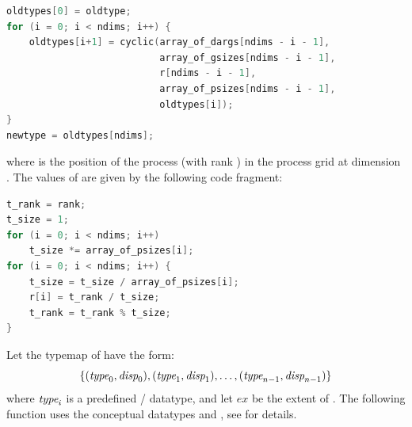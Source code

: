 \begin{lstlisting}[language=C]
oldtypes[0] = oldtype;
for (i = 0; i < ndims; i++) {
    oldtypes[i+1] = cyclic(array_of_dargs[ndims - i - 1],
                           array_of_gsizes[ndims - i - 1],
                           r[ndims - i - 1],
                           array_of_psizes[ndims - i - 1],
                           oldtypes[i]);
}
newtype = oldtypes[ndims];
\end{lstlisting}
where  is the position of the process (with rank )
in the process grid at dimension .
The values of  are given by the following code fragment:

\begin{lstlisting}[language=C]
t_rank = rank;
t_size = 1;
for (i = 0; i < ndims; i++)
    t_size *= array_of_psizes[i];
for (i = 0; i < ndims; i++) {
    t_size = t_size / array_of_psizes[i];
    r[i] = t_rank / t_size;
    t_rank = t_rank % t_size;
}
\end{lstlisting}

\noindent Let the typemap of  have the form:
\begin{displaymath}
\{(\textrm{\itshape{type}}_0,\textrm{\itshape{disp}}_0),(\textrm{\itshape{type}}_1,\textrm{\itshape{disp}}_1),\ldots,(\textrm{\itshape{type}}_{n-1},\textrm{\itshape{disp}}_{n-1})\}
\end{displaymath}
where $\textrm{\itshape{type}}_i$ is a predefined \MPI/ datatype, and let $ex$ be the
extent of .
The following function uses the conceptual datatypes 
and , see  for details.

